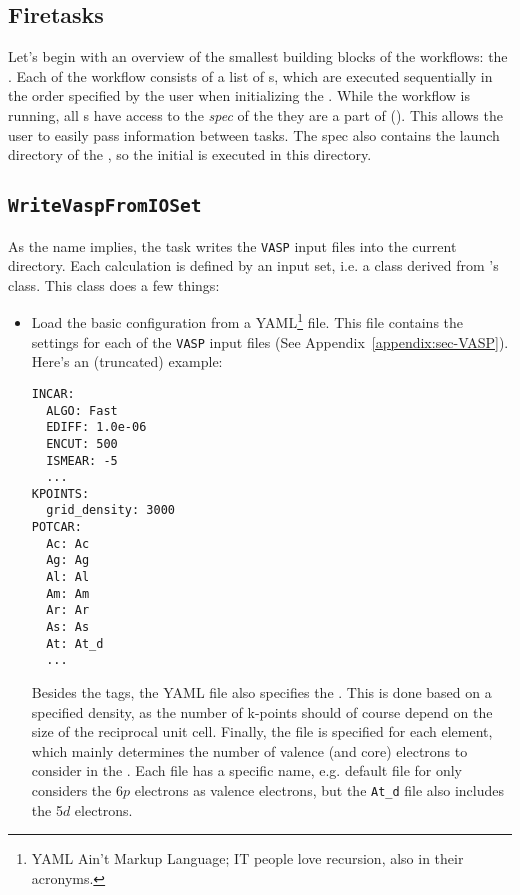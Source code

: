 \begin{refsection}
\section{Firetasks} \label{automation:sec-firetasks}

Let's begin with an overview of the smallest building blocks of the workflows: the . Each  of the workflow consists of a list of s, which are executed sequentially in the order specified by the user when initializing the . While the workflow is running, all s have access to the \textit{spec} of the  they are a part of (). This allows the user to easily pass information between tasks. The spec also contains the launch directory of the , so the initial  is executed in this directory.

\subsection{\texttt{WriteVaspFromIOSet}} \label{automation:sec-WriteVaspFromIOSet}

As the name implies, the  task writes the \texttt{VASP} input files into the current directory. Each calculation is defined by an input set, i.e. a class derived from 's  class. This class does a few things:

\begin{itemize}

\item Load the basic configuration from a YAML\footnote{YAML Ain't Markup Language; IT people love recursion, also in their acronyms.} file. This file contains the settings for each of the \texttt{VASP} input files (See Appendix~\ref{appendix:sec-VASP}). Here's an (truncated) example:
\begin{verbatim}
INCAR:
  ALGO: Fast
  EDIFF: 1.0e-06
  ENCUT: 500
  ISMEAR: -5
  ...
KPOINTS:
  grid_density: 3000
POTCAR:
  Ac: Ac
  Ag: Ag
  Al: Al
  Am: Am
  Ar: Ar
  As: As
  At: At_d
  ...
\end{verbatim}
Besides the  tags, the YAML file also specifies the . This is done based on a specified density, as the number of k-points should of course depend on the size of the reciprocal unit cell. Finally, the  file is specified for each element, which mainly determines the number of valence (and core) electrons to consider in the . Each  file has a specific name, e.g. default file for  only considers the 6$p$ electrons as valence electrons, but the \texttt{At\_d} file also includes the 5$d$ electrons.


\end{itemize}
\end{refsection}

